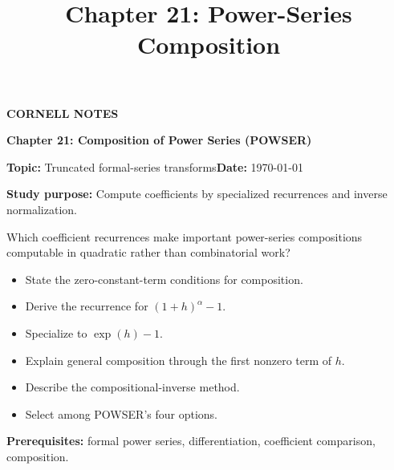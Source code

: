 \documentclass[10pt,letterpaper]{article}
\title{Chapter 21: Power-Series Composition}
\author{}
\date{}
\begin{document}
\maketitle
\begin{tcolorbox}[colback=Paper,colframe=Ink]{\small\bfseries\color{Teal}CORNELL NOTES}\par{\LARGE\bfseries Chapter 21: Composition of Power Series (POWSER)}\par\medskip\textbf{Topic:} Truncated formal-series transforms\hfill\textbf{Date:} \today\par\textbf{Study purpose:} Compute coefficients by specialized recurrences and inverse normalization.\end{tcolorbox}
\begin{tcolorbox}[colback=Teal!5,colframe=Teal,title=Essential question]Which coefficient recurrences make important power-series compositions computable in quadratic rather than combinatorial work?\end{tcolorbox}
\begin{tcolorbox}[colback=white,colframe=Mist,title=Learning objectives]\begin{itemize}\item State the zero-constant-term conditions for composition.\item Derive the recurrence for $(1+h)^\alpha-1$.\item Specialize to $\exp(h)-1$.\item Explain general composition through the first nonzero term of $h$.\item Describe the compositional-inverse method.\item Select among POWSER's four options.\end{itemize}\textbf{Prerequisites:} formal power series, differentiation, coefficient comparison, composition.\end{tcolorbox}
\end{document}
